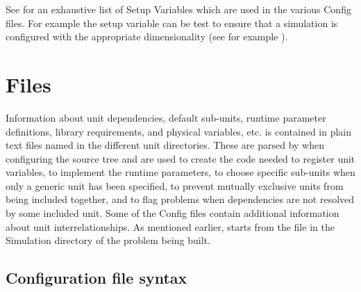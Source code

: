 See  for an exhaustive list of Setup Variables
which are used in the various Config files.  For example the setup variable 
 can be test to ensure that a simulation is configured with the appropriate
dimensionality (see for example ).

\section{ Files}
\label{Sec:Config}
% 
% 
% 
% 
% 
% 
% 
% 
% 
Information about unit dependencies, default sub-units, runtime
parameter definitions, library requirements, and physical variables, etc. 
is contained in plain text files named  in the different unit
directories. These are parsed by  when configuring the
source tree and are used to create the code needed to register unit
variables, to implement the runtime parameters, to choose specific
sub-units when only a generic unit has been specified, to prevent
mutually exclusive units from being included together, and to flag
problems when dependencies are not resolved by some included
unit. Some of the Config files contain additional information about
unit interrelationships. As mentioned earlier,  starts
from the  file in the Simulation directory of the problem
being built.

\subsection{Configuration file syntax}\label{Sec:ConfigFileSyntax}

